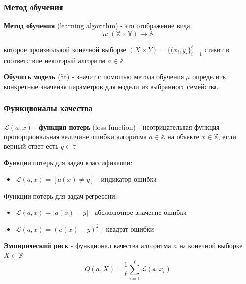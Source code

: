 \documentclass{beamer}
\begin{document}
	\begin{frame}
		\frametitle{Метод обучения}
		
		\textbf{Метод обучения} (learning algorithm) - это отображение вида
		$$
		\mu : (\mathbb{X} \times \mathbb{Y}) \to \mathbb{A}
		$$
		
		которое произвольной конечной выборке $(X \times Y) = \{(x_i, y_i\}_{i=1}^{\ell}$ ставит в соответствие 
		некоторый алгоритм $a \in \mathbb{A}$
		
		\vspace{15pt}
		
		\textbf{Обучить модель} (fit) - значит с помощью метода обучения $\mu$ определить конкретные значения параметров для модели из выбранного семейства.
	\end{frame}


	\begin{frame}
		\frametitle{Функционалы качества}
		
		$\mathcal{L}(a, x)$ - \textbf{функция потерь} (loss function)  - неотрицательная функция пропорциональная величине ошибки алгоритма $a \in \mathbb{A}$ на объекте $x \in \mathbb{X}$, если верный ответ есть $y \in \mathbb{Y}$
		
		\vspace{5pt}
		
		Функции потерь для задач классификации:
		\begin{itemize}
			\item $\mathcal{L}(a, x) = [a(x) \not= y]$ - индикатор ошибки
		\end{itemize}
		
		Функции потерь для задач регрессии:
		\begin{itemize}
			\item $\mathcal{L}(a, x) = |a(x) - y|$ - абслолютное значение ошибки
			\item $\mathcal{L}(a, x) = (a(x) - y)^2$ - квадрат ошибки
		\end{itemize}
		
		\vspace{5pt}
		
		\textbf{Эмпирический риск} - функционал качества алгоритма $a$ на конечной выборке $X \subset \mathbb{X}$
		$$
		Q(a, X) = \frac{1}{\ell} \sum_{i=1}^{\ell} \mathcal{L}(a, x_i)
		$$
	\end{frame}		
		
\end{document}
